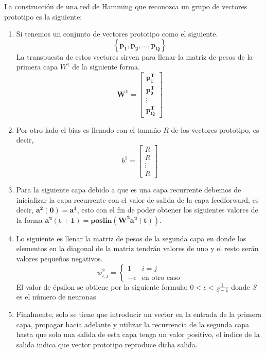         La construcción de una red de Hamming que reconozca un grupo de vectores prototipo es la siguiente:
        \begin{enumerate}
            \item Si tenemos un conjunto de vectores prototipo como el siguiente.
            \[ \left\lbrace \boldsymbol{p_1, p_2, ..., p_Q} \right\rbrace  \]
            La transpuesta de estos vectores sirven para llenar la matriz de pesos de la primera capa $W^1$ de la siguiente forma.
            \[\boldsymbol{ W^{1}} = \left[\begin{array}{c}\boldsymbol{p^{T}_1}\\\boldsymbol{ p^{T}_2}\\ \vdots \\ \boldsymbol{p^{T}_Q}\end{array}\right]  \]
            \item Por otro lado el bias es llenado con el tamaño $R$ de los vectores prototipo, es decir,
            \[ b^{1} = \left[\begin{array}{c}R\\ R\\ \vdots \\ R\end{array}\right] \]
            \item Para la siguiente capa debido a que es una capa recurrente debemos de inicializar la capa recurrente con el valor de salida de la capa feedforward, es decir, $\boldsymbol{a^2(0) = a^1}$, esto con el fin de poder obtener los siguientes valores de la forma $\boldsymbol{a^2(t+1) = poslin(W^2a^2(t))}$.
            \item Lo siguiente es llenar la matriz de pesos de la segunda capa en donde los elementos en la diagonal de la matriz tendrán valores de uno y el resto serán valores pequeños negativos.
            \[ w^2_{i,j} = \begin{cases} 1 & i=j \\-\epsilon & \text{en otro caso} \end{cases} \]
            El valor de épsilon se obtiene por la siguiente formula: $ 0 < \epsilon <\frac{1}{S-1}$ donde $S$ es el número de neuronas
            \item Finalmente, solo se tiene que introducir un vector en la entrada de la primera capa, propagar hacia adelante y utilizar la recurrencia de la segunda capa hasta que solo una salida de esta capa tenga un valor positivo, el indice de la salida indica que vector prototipo reproduce dicha salida.
        \end{enumerate}
    \newpage
